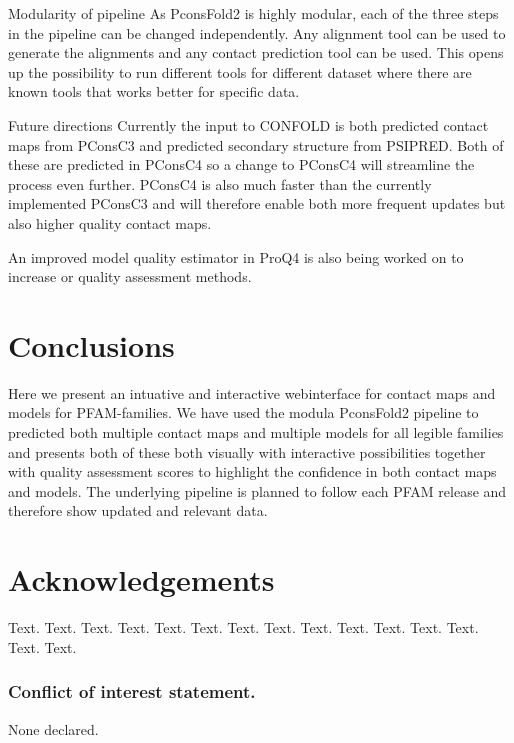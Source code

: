 \documentclass[a4,center,fleqn]{NAR}
\begin{document}
Modularity of pipeline
As PconsFold2 is highly modular, each of the three steps in the pipeline
can be changed independently. Any alignment tool can be used to generate the 
alignments and any contact prediction tool can be used. This opens up
the possibility to run different tools for different dataset where
there are known tools that works better for specific data.

Future directions
Currently the input to CONFOLD is both predicted contact maps from PConsC3 and
predicted secondary structure from PSIPRED. Both of these are predicted in PConsC4
so a change to PConsC4 will streamline the process even further. PConsC4 is also
much faster than the currently implemented PConsC3 and will therefore enable
both more frequent updates but also higher quality contact maps.

An improved model quality estimator in ProQ4 is also being worked on to increase
or quality assessment methods.

\section{Conclusions}
Here we present an intuative and interactive webinterface for contact maps and 
models for PFAM-families. We have used the modula PconsFold2 pipeline to predicted
both multiple contact maps and multiple models for all legible families and presents
both of these both visually with interactive possibilities together with quality 
assessment scores to highlight the confidence in both contact maps and models.
The underlying pipeline is planned to follow each PFAM release and therefore
show updated and relevant data.

\section{Acknowledgements}

Text. Text. Text. Text. Text. Text. Text. Text. Text. Text. Text.
Text. Text. Text. Text.


\subsubsection{Conflict of interest statement.} None declared.



\end{document}
